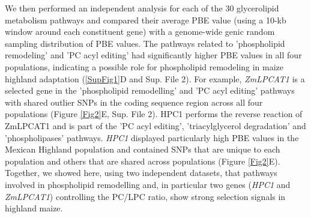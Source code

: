 \documentclass[9pt,twocolumn,twoside,lineno]{biorxiv}
\begin{document}
We then performed an independent analysis for each of the 30 glycerolipid metabolism pathways and compared their average PBE value (using a 10-kb window around each constituent gene)  with a genome-wide genic random sampling distribution of PBE values. 
The pathways related to 'phospholipid remodeling'  and 'PC acyl editing' had significantly higher PBE values in all four populations, indicating a possible role for phospholipid remodeling in maize highland adaptation (\ref{SupFig1}D and Sup. File 2). 
For example, \textit{ZmLPCAT1} is a selected gene  in the 'phospholipid remodelling' and 'PC acyl editing' pathways with shared outlier SNPs in the coding sequence region across all four populations (Figure \ref{Fig2}E, Sup. File 2). 
HPC1 performs the reverse reaction of ZmLPCAT1 and is part of the 'PC acyl editing', 'triacylglycerol degradation' and 'phospholipases' pathways. 
\textit{HPC1} displayed particularly high PBE values in the Mexican Highland population and contained SNPs that are unique to each population and others that are shared across populations (Figure \ref{Fig2}E). 
Together, we showed here, using two independent datasets, that pathways involved in phospholipid remodelling and, in particular two genes (\textit{HPC1} and \textit{ZmLPCAT1}) controlling the PC/LPC ratio, show strong selection signals in highland maize.
\end{document}

